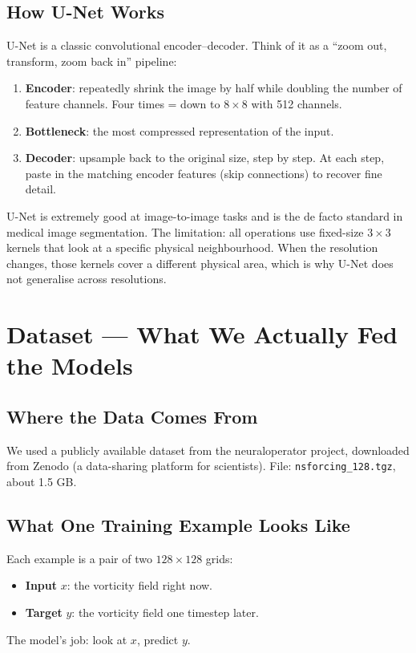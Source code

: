\documentclass[acmsmall,nonacm]{acmart}
\begin{document}
\subsection{How U-Net Works}

U-Net is a classic convolutional encoder--decoder.
Think of it as a ``zoom out, transform, zoom back in'' pipeline:

\begin{enumerate}
  \item \textbf{Encoder}: repeatedly shrink the image by half while doubling
        the number of feature channels. Four times = down to $8 \times 8$ with
        512 channels.
  \item \textbf{Bottleneck}: the most compressed representation of the input.
  \item \textbf{Decoder}: upsample back to the original size, step by step.
        At each step, paste in the matching encoder features (skip connections)
        to recover fine detail.
\end{enumerate}

U-Net is extremely good at image-to-image tasks and is the de facto standard in
medical image segmentation.
The limitation: all operations use fixed-size $3 \times 3$ kernels that look at
a specific physical neighbourhood.
When the resolution changes, those kernels cover a different physical area,
which is why U-Net does not generalise across resolutions.

\section{Dataset --- What We Actually Fed the Models}

\subsection{Where the Data Comes From}

We used a publicly available dataset from the neuraloperator project, downloaded
from Zenodo (a data-sharing platform for scientists).
File: \texttt{nsforcing\_128.tgz}, about 1.5 GB.

\subsection{What One Training Example Looks Like}

Each example is a pair of two $128 \times 128$ grids:
\begin{itemize}
  \item \textbf{Input} $x$: the vorticity field right now.
  \item \textbf{Target} $y$: the vorticity field one timestep later.
\end{itemize}
The model's job: look at $x$, predict $y$.
\end{document}
